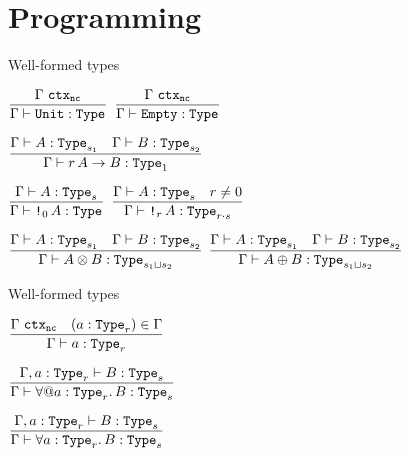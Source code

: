\section{Programming}

\begin{frame}{Well-formed types}

\begin{center}
  $\infrule{\ctx[\noncomputable]{\Gamma}}{\type{\Unit}}$ \quad
  $\infrule{\ctx[\noncomputable]{\Gamma}}{\type{\Empty}}$

  \vspace{2em}

  $\infrule{\type{A}[s_1] \quad \type{B}[s_2]}{\type{\Fun[r]{A}{B}}[\One]}$

  \vspace{2em}

  $\infrule{\type{A}[s]}{\type{\Box[\Zero]{A}}}$ \quad
  $\infrule{\type{A}[s] \quad r \neq \Zero}{\type{\Box[r]{A}}[\mulqty{r}{s}]}$

  \vspace{2em}

  $\infrule{\type{A}[s_1] \quad \type{B}[s_2]}{\type{\Prod{A}{B}}[\lubqty{s_1}{s_2}]}$ \quad
  $\infrule{\type{A}[s_1] \quad \type{B}[s_2]}{\type{\Sum{A}{B}}[\lubqty{s_1}{s_2}]}$
\end{center}

\end{frame}

\begin{frame}{Well-formed types}

\begin{center}
  $\infrule{\ctx[\noncomputable]{\Gamma} \quad (a : \Type[r]) \in \Gamma}{\type{a}[r]}$

  \vspace{2em}

  $\infrule{\type[\extendtype{\Gamma}{a}[r]]{B}[s]}{\type{\ForallE{a}[r]{B}}[s]}$

  \vspace{2em}

  $\infrule{\type[\extendtype{\Gamma}{a}[r]]{B}[s]}{\type{\ForallI{a}[r]{B}}[s]}$
\end{center}

\end{frame}

